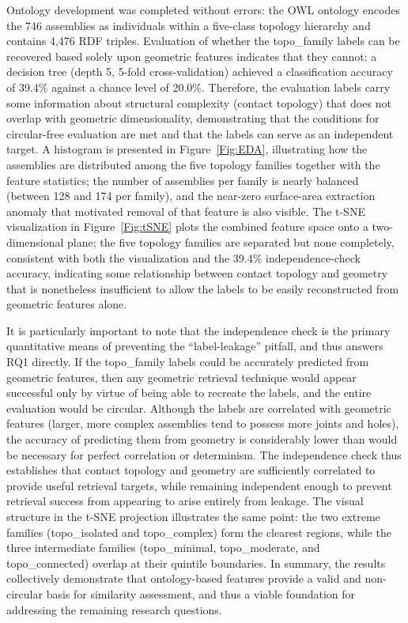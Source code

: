 \documentclass[preprint,12pt]{elsarticle}
\begin{document}
Ontology development was completed without errors: the OWL ontology encodes the 746 assemblies as individuals within a five-class topology hierarchy and contains 4,476 RDF triples.
Evaluation of whether the topo\_family labels can be recovered based solely upon geometric features indicates that they cannot: a decision tree (depth 5, 5-fold cross-validation) achieved a classification accuracy of 39.4\% against a chance level of 20.0\%.
Therefore, the evaluation labels carry some information about structural complexity (contact topology) that does not overlap with geometric dimensionality, demonstrating that the conditions for circular-free evaluation are met and that the labels can serve as an independent target.
A histogram is presented in Figure~\ref{Fig:EDA}, illustrating how the assemblies are distributed among the five topology families together with the feature statistics; the number of assemblies per family is nearly balanced (between 128 and 174 per family), and the near-zero surface-area extraction anomaly that motivated removal of that feature is also visible.
The t-SNE visualization in Figure~\ref{Fig:tSNE} plots the combined feature space onto a two-dimensional plane; the five topology families are separated but none completely, consistent with both the visualization and the 39.4\% independence-check accuracy, indicating some relationship between contact topology and geometry that is nonetheless insufficient to allow the labels to be easily reconstructed from geometric features alone.

It is particularly important to note that the independence check is the primary quantitative means of preventing the ``label-leakage'' pitfall, and thus answers RQ1 directly.
If the topo\_family labels could be accurately predicted from geometric features, then any geometric retrieval technique would appear successful only by virtue of being able to recreate the labels, and the entire evaluation would be circular.
Although the labels are correlated with geometric features (larger, more complex assemblies tend to possess more joints and holes), the accuracy of predicting them from geometry is considerably lower than would be necessary for perfect correlation or determinism.
The independence check thus establishes that contact topology and geometry are sufficiently correlated to provide useful retrieval targets, while remaining independent enough to prevent retrieval success from appearing to arise entirely from leakage.
The visual structure in the t-SNE projection illustrates the same point: the two extreme families (topo\_isolated and topo\_complex) form the clearest regions, while the three intermediate families (topo\_minimal, topo\_moderate, and topo\_connected) overlap at their quintile boundaries.
In summary, the results collectively demonstrate that ontology-based features provide a valid and non-circular basis for similarity assessment, and thus a viable foundation for addressing the remaining research questions.
\end{document}
